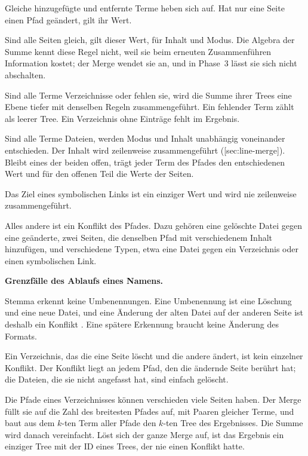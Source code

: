 \startitemize[n]
\item Gleiche hinzugefügte und entfernte Terme heben sich auf.
Hat nur eine Seite einen Pfad geändert, gilt ihr Wert.
\item Sind alle Seiten gleich, gilt dieser Wert, für Inhalt und Modus.
Die Algebra der Summe kennt diese Regel nicht,
weil sie beim erneuten Zusammenführen Information kostet;
der Merge wendet sie an, und in Phase~3 lässt sie sich nicht abschalten.
\item Sind alle Terme Verzeichnisse oder fehlen sie, wird die Summe ihrer Trees eine Ebene tiefer
mit denselben Regeln zusammengeführt. Ein fehlender Term zählt als leerer Tree.
Ein Verzeichnis ohne Einträge fehlt im Ergebnis.
\item Sind alle Terme Dateien, werden Modus und Inhalt unabhängig voneinander entschieden.
Der Inhalt wird zeilenweise zusammengeführt ([sec:line-merge]).
Bleibt eines der beiden offen, trägt jeder Term des Pfades den entschiedenen Wert
und für den offenen Teil die Werte der Seiten.
\item Das Ziel eines symbolischen Links ist ein einziger Wert und wird nie zeilenweise
zusammengeführt.
\item Alles andere ist ein Konflikt des Pfades. Dazu gehören eine gelöschte Datei gegen eine
geänderte, zwei Seiten, die denselben Pfad mit verschiedenem Inhalt hinzufügen,
und verschiedene Typen, etwa eine Datei gegen ein Verzeichnis
oder einen symbolischen Link.
\stopitemize

\startinfobox
{\bf Grenzfälle des Ablaufs eines Namens.}
\startitemize
\item Stemma erkennt keine Umbenennungen. Eine Umbenennung ist eine Löschung und eine neue Datei,
und eine Änderung der alten Datei auf der anderen Seite ist deshalb ein Konflikt
. Eine spätere Erkennung braucht keine Änderung des Formats.
\item Ein Verzeichnis, das die eine Seite löscht und die andere ändert, ist kein einzelner
Konflikt. Der Konflikt liegt an jedem Pfad, den die ändernde Seite berührt hat;
die Dateien, die sie nicht angefasst hat, sind einfach gelöscht.
\stopitemize
\stopinfobox

Die Pfade eines Verzeichnisses können verschieden viele Seiten haben.
Der Merge füllt sie auf die Zahl des breitesten Pfades auf, mit Paaren gleicher Terme,
und baut aus dem $k$-ten Term aller Pfade den $k$-ten Tree des Ergebnisses.
Die Summe wird danach vereinfacht.
Löst sich der ganze Merge auf, ist das Ergebnis ein einziger Tree
mit der ID eines Trees, der nie einen Konflikt hatte.

